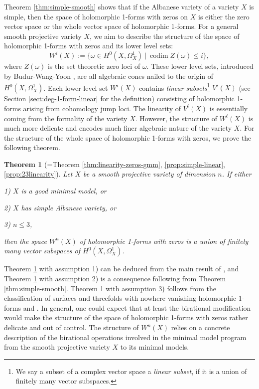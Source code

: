 \documentclass[a4paper,12pt,reqno]{amsart}
\newtheorem{theorem}{Theorem}[section]
\theoremstyle{question}
\theoremstyle{definition}
\theoremstyle{remark}
\theoremstyle{cited}
\theoremstyle{citeddef}
\DeclareMathOperator{\codim}{codim}
\begin{document}
Theorem \ref{thm:simple-smooth} shows that if the Albanese variety of a variety $X$ is simple, then the space of holomorphic 1-forms with zeros on $X$ is either the zero vector space or the whole vector space of holomorphic 1-forms. For a general smooth projective variety $X$, we aim to describe the structure of the space of holomorphic 1-forms
with zeros and its lower level sets:
\[
W^i(X):=\{\omega\in H^0(X, \Omega_X^1)\ |\ \codim Z(\omega)\leq i \},
\] 
where $Z(\omega)$ is the set theoretic zero loci of $\omega$. These lower level sets, introduced by Budur-Wang-Yoon \cite{BWY16}, are all algebraic cones nailed to the origin of $H^0(X,\Omega_X^1)$. Each lower level set $W^i(X)$ contains \textit{linear subsets}\footnote{We say a subset of a complex vector space a \textit{linear subset}, if it is a union of finitely many vector subspaces.} $V^i(X)$ (see Section \ref{sect:deg-1-form-linear} for the definition) consisting of holomorphic 1-forms arising from cohomology jump loci. The linearity of $V^i(X)$ is essentially coming from the formality of the variety $X$. However, the structure of $W^i(X)$ is much more delicate and encodes much finer algebraic nature of the variety $X$. For the structure of the whole space of holomorphic 1-forms with zeros, we prove the following theorem.

\begin{theorem}[{=Theorem \ref{thm:linearity-zeros-gmm}, \ref{prop:simple-linear}, \ref{prop:23linearity}}]\label{prop:gmm-sav-linear}
    Let $X$ be a smooth projective variety of dimension $n$. If either
    
    1) $X$ is a good minimal model, or

    2) $X$ has simple Albanese variety, or

    3) $n\leq 3$,
    
    \noindent then the space $W^n(X)$ of holomorphic 1-forms with zeros is a union of finitely many vector subspaces of $H^0(X,\Omega_X^1)$. 
\end{theorem}

Theorem \ref{prop:gmm-sav-linear} with assumption 1) can be deduced from the main result of \cite{HWZ26}, and Theorem \ref{prop:gmm-sav-linear} with assumption 2) is a consequence following from Theorem \ref{thm:simple-smooth}. Theorem \ref{prop:gmm-sav-linear} with assumption 3) follows from the classification of surfaces and threefolds with nowhere vanishing holomorphic 1-forms \cite{Sch21} and \cite{HS21}. In general, one could expect that at least the birational modification would make the structure of the space of holomorphic 1-forms with zeros rather delicate and out of control. The structure of $W^n(X)$ relies on a concrete description of the birational operations involved in the minimal model program from the smooth projective variety $X$ to its minimal models.
\end{document}
